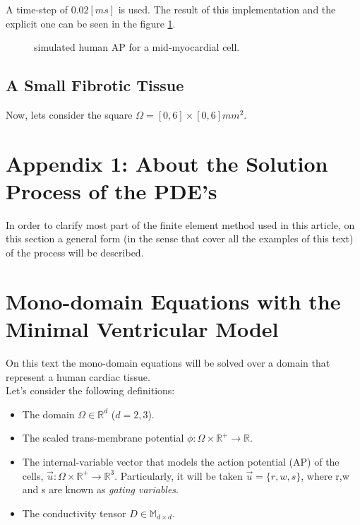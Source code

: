 A time-step of $0.02 [ms]$ is used. The result of this implementation and the explicit one can be seen in the figure \ref{fig:mde_min_ex1_single-cell}.

\begin{figure}[H]
\centering
\caption{simulated human AP for a mid-myocardial cell.} \label{fig:mde_min_ex1_single-cell}
\end{figure}

\subsection{A Small Fibrotic Tissue}

Now, lets consider the square $\Omega = [0, 6] \times [0, 6] mm^2$.

\newpage 

\section{Appendix 1: About the Solution Process of the PDE's}

In order to clarify most part of the finite element method used in this article, on this section a general form (in the sense that cover all the examples of this text) of the process will be described.


\section{Mono-domain Equations with the Minimal Ventricular Model}

On this text the mono-domain equations will be solved over a domain that represent a human cardiac tissue.\\

Let's consider the following definitions:

\begin{itemize}
\item The domain $\Omega \in \mathbb{R}^d$ ($d = 2,3$).
\item The scaled trans-membrane potential $\phi: \Omega \times \mathbb{R^+} \rightarrow \mathbb{R}$.
\item The internal-variable vector that models the action potential (AP) of the cells, $\vec{u}: \Omega \times \mathbb{R}^+ \rightarrow \mathbb{R}^3$. Particularly, it will be taken $\vec{u} = \{ r,w,s \}$, where r,w and s are known as \textsl{gating variables}.
\item The conductivity tensor $D \in \mathbb{M}_{d \times d}$.
\end{itemize}

